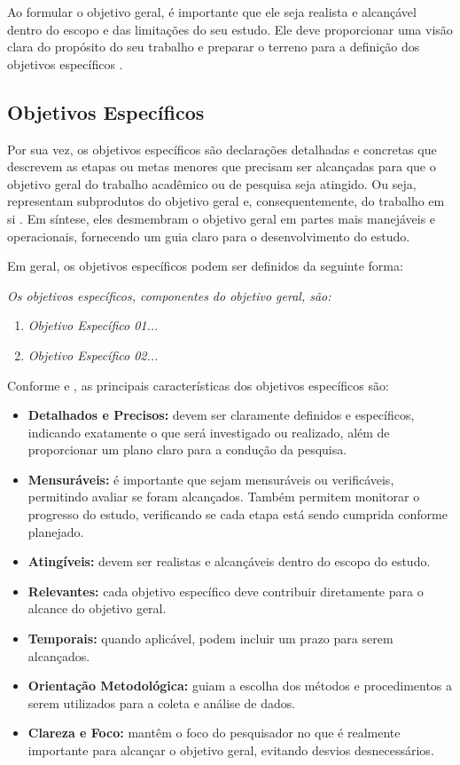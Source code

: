 Ao formular o objetivo geral, é importante que ele seja realista e alcançável dentro do escopo e das limitações do seu estudo. Ele deve proporcionar uma visão clara do propósito do seu trabalho e preparar o terreno para a definição dos objetivos específicos \cite{Marconi2021}.

\subsection{Objetivos Específicos}\label{sec:obj_proj_esp}

Por sua vez, os objetivos específicos são declarações detalhadas e concretas que descrevem as etapas ou metas menores que precisam ser alcançadas para que o objetivo geral do trabalho acadêmico ou de pesquisa seja atingido. Ou seja, representam subprodutos do objetivo geral e, consequentemente, do trabalho em si \cite{Wazlawick2021}. Em síntese, eles desmembram o objetivo geral em partes mais manejáveis e operacionais, fornecendo um guia claro para o desenvolvimento do estudo.

Em geral, os objetivos específicos podem ser definidos da seguinte forma:

\textit{Os objetivos específicos, componentes do objetivo geral, são:}
\begin{enumerate}[label=\textit{\alph*)}, nosep, leftmargin=2.5cm]
    \item \textit{Objetivo Específico 01...}
    \item \textit{Objetivo Específico 02...}
\end{enumerate}

Conforme  e , as principais características dos objetivos específicos são:
\begin{itemize}[nosep, leftmargin=2.5cm]
    \item \textbf{Detalhados e Precisos:} devem ser claramente definidos e específicos, indicando exatamente o que será investigado ou realizado, além de proporcionar um plano claro para a condução da pesquisa.
    \item \textbf{Mensuráveis:} é importante que sejam mensuráveis ou verificáveis, permitindo avaliar se foram alcançados. Também permitem monitorar o progresso do estudo, verificando se cada etapa está sendo cumprida conforme planejado.
    \item \textbf{Atingíveis:} devem ser realistas e alcançáveis dentro do escopo do estudo.
    \item \textbf{Relevantes:} cada objetivo específico deve contribuir diretamente para o alcance do objetivo geral.
    \item \textbf{Temporais:} quando aplicável, podem incluir um prazo para serem alcançados.
    \item \textbf{Orientação Metodológica:} guiam a escolha dos métodos e procedimentos a serem utilizados para a coleta e análise de dados.
    \item \textbf{Clareza e Foco:} mantêm o foco do pesquisador no que é realmente importante para alcançar o objetivo geral, evitando desvios desnecessários.
\end{itemize}


